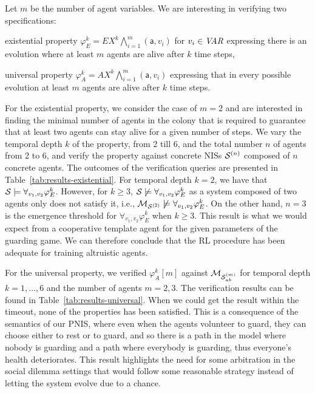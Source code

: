 Let $m$ be the number of agent variables. We are interesting in verifying two
specifications:
\begin{inparaenum}[\it (i)]
\item existential property
  $\varphi^k_E = EX^k \bigwedge_{i=1}^m(\mathsf{a},v_i)$ for $v_i \in\it{VAR}$
  expressing there is an evolution where at least $m$ agents are alive after
  $k$ time steps,
\item universal property $\varphi^k_A = AX^k \bigwedge_{i=1}^m(\mathsf{a},v_i)$
  expressing that in every possible evolution at least $m$ agents are alive
  after $k$ time steps.
\end{inparaenum}

For the existential property, we consider the case of $m=2$ and are interested
in finding the minimal number of agents in the colony that is required to
guarantee that at least two agents can stay alive for a given number of
steps. We vary the temporal depth $k$ of the property, from 2 till 6, and the
total number $n$ of agents from 2 to 6, and verify the property against
concrete NISs $\mathcal{S}^{(n)}$ composed of $n$ concrete agents.  The outcomes of the
verification queries are presented in Table~\ref{tab:results-existential}.
%
For temporal depth $k=2$, we have that
$\mathcal S\models \forall_{v_1,v_2}\varphi^k_E$. However, for $k\geq 3$,
$\mathcal S\not\models\forall_{v_1,v_2}\varphi^k_E$ as a system composed of two
agents only does not satisfy it, i.e.,
$\mathcal{M}_{\mathcal{S}^{(2)}}\not\models\forall_{v_1,v_2}\varphi^k_E$. On the other hand, $n=3$ is
the emergence threshold for $\forall_{v_1,v_2}\varphi^k_E$ when $k\geq 3$. This
result is what we would expect from a cooperative template agent for the given
parameters of the guarding game. We can therefore conclude that the RL
procedure has been adequate for training altruistic agents.

For the universal property, we verified $\varphi^k_A[m]$ against $\mathcal{M}_{\mathcal{S}_{ab}^{(m)}}$
for temporal depth $k = 1,\dots,6$ and the number of agents $m=2,3$. The
verification results can be found in Table~\ref{tab:results-universal}.  When
we could get the result within the timeout, none of the properties has been
satisfied. This is a consequence of the semantics of our PNIS, where even when
the agents volunteer to guard, they can choose either to rest or to guard, and
so there is a path in the model where nobody is guarding and a path where
everybody is guarding, thus everyone's health deteriorates. This result
highlights the need for some arbitration in the social dilemma settings that
would follow some reasonable strategy instead of letting the system evolve due
to a chance.

